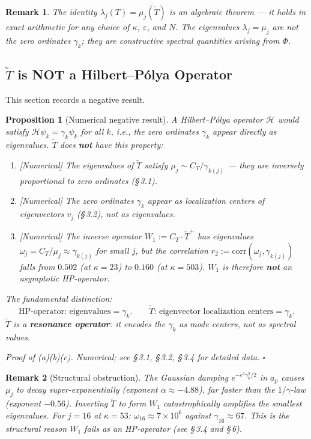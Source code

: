 \documentclass[11pt]{article}
\newtheorem{proposition}[theorem]{Proposition}
\newtheorem*{remark}{Remark}
\newcommand{\Tt}{\widetilde{T}}
\newcommand{\CT}{C_{T}}
\newcommand{\Wone}{W_1}
\begin{document}
\begin{remark}
The identity $\lambda_j(T)=\mu_j(\Tt)$ is an \emph{algebraic} theorem
--- it holds in exact arithmetic for any choice of $\kappa$, $\varepsilon$,
and $N$.
The eigenvalues $\lambda_j = \mu_j$ are not the zero ordinates $\gamma_k$;
they are constructive spectral quantities arising from $\Phi$.
\end{remark}

\subsection{$\Tt$ is NOT a Hilbert--P\'olya Operator}

This section records a negative result.

\begin{proposition}[Numerical negative result]\label{prop:not-HP}
A Hilbert--P\'olya operator $\mathcal{H}$ would satisfy
$\mathcal{H}\psi_k = \gamma_k\psi_k$ for all $k$,
i.e., the zero ordinates $\gamma_k$ appear directly as eigenvalues.
$\Tt$ does \textbf{not} have this property:
\begin{enumerate}[label=(\alph*)]
\item \emph{[Numerical]} The eigenvalues of $\Tt$ satisfy
  $\mu_j\sim\CT/\gamma_{k(j)}$ --- they are \emph{inversely} proportional
  to zero ordinates (\S\,3.1).
\item \emph{[Numerical]} The zero ordinates $\gamma_k$ appear as
  \emph{localization centers} of eigenvectors $v_j$ (\S\,3.2),
  not as eigenvalues.
\item \emph{[Numerical]} The inverse operator $\Wone := \CT\cdot\Tt^+$
  has eigenvalues $\omega_j = \CT/\mu_j \approx \gamma_{k(j)}$
  for small $j$, but the correlation
  $r_2 := \mathrm{corr}(\omega_j, \gamma_{k(j)})$
  falls from $0.502$ (at $\kappa=23$) to $0.160$ (at $\kappa=503$).
  $\Wone$ is therefore \textbf{not} an asymptotic HP-operator.
\end{enumerate}
\emph{The fundamental distinction:}
\[
\text{HP-operator: eigenvalues} = \gamma_k.
\qquad
\Tt\text{: eigenvector localization centers} = \gamma_k.
\]
$\Tt$ is a \textbf{resonance operator}: it encodes the $\gamma_k$
as mode centers, not as spectral values.

\emph{Proof of (a)(b)(c).}
Numerical; see \S\,3.1, \S\,3.2, \S\,3.4 for detailed data. $\square$
\end{proposition}

\begin{remark}[Structural obstruction]
The Gaussian damping $e^{-\varepsilon^2\gamma_k^2/2}$ in $a_p$ causes
$\mu_j$ to decay super-exponentially (exponent $\alpha\approx -4.88$),
far faster than the $1/\gamma$-law (exponent $-0.56$).
Inverting $\Tt$ to form $\Wone$ catastrophically amplifies the smallest
eigenvalues.
For $j=16$ at $\kappa=53$:
$\omega_{16}\approx 7\times 10^6$ against $\gamma_{16}\approx 67$.
This is the structural reason $\Wone$ fails as an HP-operator
(see \S\,3.4 and \S\,6).
\end{remark}
\end{document}
